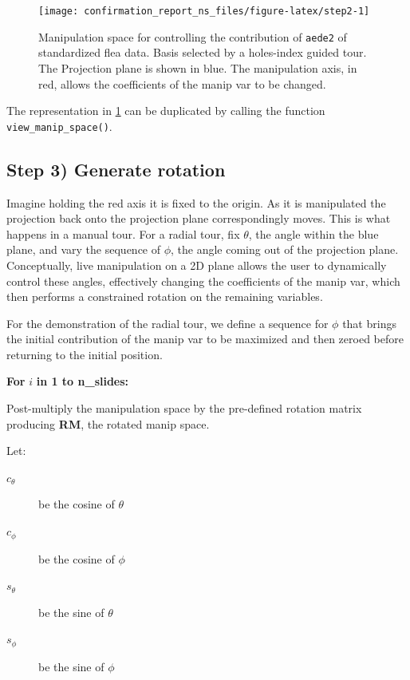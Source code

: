 \documentclass{monashthesis}
\begin{document}
\begin{figure}

{\centering \texttt{[image: confirmation\_report\_ns\_files/figure-latex/step2-1]} 

}

\caption{Manipulation space for controlling the contribution of \texttt{aede2} of standardized flea data. Basis selected by a holes-index guided tour. The Projection plane is shown in blue. The manipulation axis, in red, allows the coefficients of the manip var to be changed.}\label{fig:step2}
\end{figure}

The representation in \ref{fig:step2} can be duplicated by calling the function \texttt{view\_manip\_space()}.

\hypertarget{step-3-generate-rotation}{%
\subsection{Step 3) Generate rotation}\label{step-3-generate-rotation}}

Imagine holding the red axis it is fixed to the origin. As it is manipulated the projection back onto the projection plane correspondingly moves. This is what happens in a manual tour. For a radial tour, fix \(\theta\), the angle within the blue plane, and vary the sequence of \(\phi\), the angle coming out of the projection plane. Conceptually, live manipulation on a 2D plane allows the user to dynamically control these angles, effectively changing the coefficients of the manip var, which then performs a constrained rotation on the remaining variables.

For the demonstration of the radial tour, we define a sequence for \(\phi\) that brings the initial contribution of the manip var to be maximized and then zeroed before returning to the initial position.

\textbf{For } \(i\) \textbf{in 1 to n\_slides:}

Post-multiply the manipulation space by the pre-defined rotation matrix producing \textbf{RM}, the rotated manip space.

Let:

\begin{description}
  \item[$c_\theta$] be the cosine of $\theta$
  \item[$c_\phi$]   be the cosine of $\phi$
  \item[$s_\theta$] be the sine of   $\theta$
  \item[$s_\phi$]   be the sine of   $\phi$
\end{description}
\end{document}
